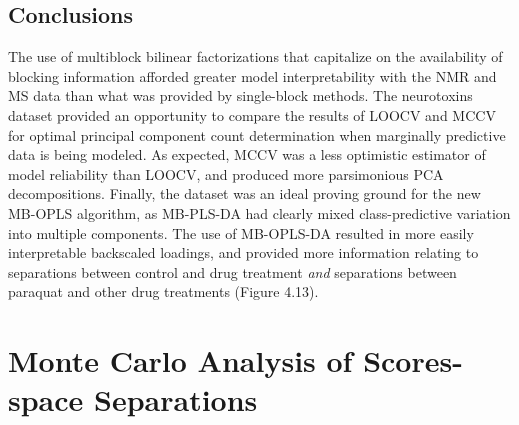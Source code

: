 \subsection{Conclusions}

\begin{doublespace}
The use of multiblock bilinear factorizations that capitalize on the
availability of blocking information afforded greater model interpretability
with the NMR and MS data than what was provided by single-block methods. The
neurotoxins dataset provided an opportunity to compare the results of LOOCV
and MCCV for optimal principal component count determination when marginally
predictive data is being modeled. As expected, MCCV was a less optimistic
estimator of model reliability than LOOCV, and produced more parsimonious PCA
decompositions. Finally, the dataset was an ideal proving ground for the new
MB-OPLS algorithm, as MB-PLS-DA had clearly mixed class-predictive variation
into multiple components. The use of MB-OPLS-DA resulted in more easily
interpretable backscaled loadings, and provided more information relating to
separations between control and drug treatment \emph{and} separations between
paraquat and other drug treatments (Figure 4.13).
\end{doublespace}

\section{Monte Carlo Analysis of Scores-space Separations}

